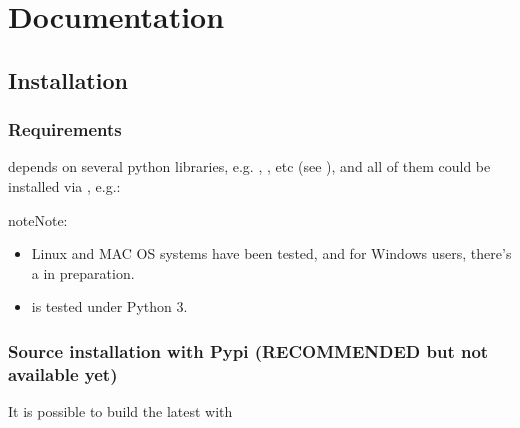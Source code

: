 \documentclass[letterpaper,10pt,english]{sphinxmanual}
\begin{document}
\chapter{Documentation}
\label{\detokenize{index:documentation}}

\section{Installation}
\label{\detokenize{install:installation}}\label{\detokenize{install::doc}}

\subsection{Requirements}
\label{\detokenize{install:requirements}}
 depends on several python libraries, e.g.
, , etc
(see ),
and all of them could be installed via , e.g.:

\begin{sphinxVerbatim}[commandchars=\\\{\}]
   
\end{sphinxVerbatim}

\begin{sphinxadmonition}{note}{Note:}\begin{itemize}
\item {} 
Linux and MAC OS systems have been tested, and for Windows users, there’s a  in preparation.

\item {} 
 is tested under Python 3.

\end{itemize}
\end{sphinxadmonition}


\subsection{Source installation with Pypi (RECOMMENDED but not available yet)}
\label{\detokenize{install:source-installation-with-pypi-recommended-but-not-available-yet}}
It is possible to build the latest  with 
\end{document}
